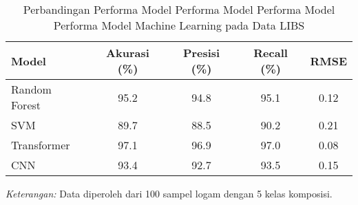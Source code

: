     \begin{table}[H]
        \centering
        \caption{Perbandingan Performa Model Performa Model Performa Model Performa Model Machine Learning pada Data LIBS}
        \label{tab:performa_ml}
        \centering
        \begin{tabular}{lcccc}
          \toprule
          Model & Akurasi (\%) & Presisi (\%) & Recall (\%) & RMSE \\
          \midrule
          Random Forest & 95.2 & 94.8 & 95.1 & 0.12 \\
          SVM & 89.7 & 88.5 & 90.2 & 0.21 \\
          Transformer & 97.1 & 96.9 & 97.0 & 0.08 \\
          CNN & 93.4 & 92.7 & 93.5 & 0.15 \\
          \bottomrule
        \end{tabular}
        
        \smallskip
        \footnotesize
        \textit{Keterangan:} Data diperoleh dari 100 sampel logam dengan 5 kelas komposisi.
      \end{table}
    

% 